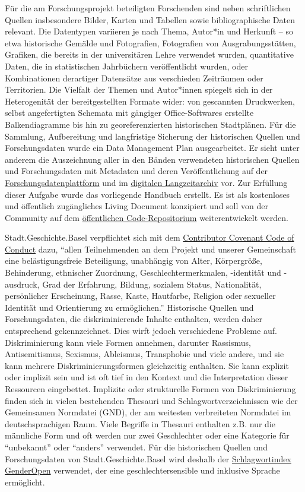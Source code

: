 \documentclass[
  letterpaper,
  DIV=11,
  numbers=noendperiod]{scrartcl}
\begin{document}
Für die am Forschungsprojekt beteiligten Forschenden sind neben
schriftlichen Quellen insbesondere Bilder, Karten und Tabellen sowie
bibliographische Daten relevant. Die Datentypen variieren je nach Thema,
Autor*in und Herkunft -- so etwa historische Gemälde und Fotografien,
Fotografien von Ausgrabungsstätten, Grafiken, die bereits in der
universitären Lehre verwendet wurden, quantitative Daten, die in
statistischen Jahrbüchern veröffentlicht wurden, oder Kombinationen
derartiger Datensätze aus verschieden Zeiträumen oder Territorien. Die
Vielfalt der Themen und Autor*innen spiegelt sich in der Heterogenität
der bereitgestellten Formate wider: von gescannten Druckwerken, selbst
angefertigten Schemata mit gängiger Office-Softwares erstellte
Balkendiagramme bis hin zu georeferenzierten historischen Stadtplänen.
Für die Sammlung, Aufbereitung und langfristige Sicherung der
historischen Quellen und Forschungsdaten wurde ein Data Management Plan
ausgearbeitet. Er sieht unter anderem die Auszeichnung aller in den
Bänden verwendeten historischen Quellen und Forschungsdaten mit
Metadaten und deren Veröffentlichung auf der
\href{https://forschung.stadtgeschichtebasel.ch/}{Forschungsdatenplattform}
und im
\href{https://zenodo.org/communities/stadt-geschichte-basel/}{digitalen
Langzeitarchiv} vor. Zur Erfüllung dieser Aufgabe wurde das vorliegende
Handbuch erstellt. Es ist als kostenloses und öffentlich zugängliches
Living Document konzipiert und soll von der Community auf dem
\href{https://github.com/maehr/diskriminierungsfreie-metadaten}{öffentlichen
Code-Repositorium} weiterentwickelt werden.

Stadt.Geschichte.Basel verpflichtet sich mit dem
\href{https://www.contributor-covenant.org/version/2/1/code_of_conduct/}{Contributor
Covenant Code of Conduct} dazu, ``allen Teilnehmenden an dem Projekt und
unserer Gemeinschaft eine belästigungsfreie Beteiligung, unabhängig von
Alter, Körpergröße, Behinderung, ethnischer Zuordnung,
Geschlechtermerkmalen, -identität und -ausdruck, Grad der Erfahrung,
Bildung, sozialem Status, Nationalität, persönlicher Erscheinung, Rasse,
Kaste, Hautfarbe, Religion oder sexueller Identität und Orientierung zu
ermöglichen.'' Historische Quellen und Forschungsdaten, die
diskriminierende Inhalte enthalten, werden daher entsprechend
gekennzeichnet. Dies wirft jedoch verschiedene Probleme auf.
Diskriminierung kann viele Formen annehmen, darunter Rassismus,
Antisemitismus, Sexismus, Ableismus, Transphobie und viele andere, und
sie kann mehrere Diskriminierungsformen gleichzeitig enthalten. Sie kann
explizit oder implizit sein und ist oft tief in den Kontext und die
Interpretation dieser Ressourcen eingebettet. Implizite oder
strukturelle Formen von Diskriminierung finden sich in vielen
bestehenden Thesauri und Schlagwortverzeichnissen wie der Gemeinsamen
Normdatei (GND), der am weitesten verbreiteten Normdatei im
deutschsprachigen Raum. Viele Begriffe in Thesauri enthalten z.B. nur
die männliche Form und oft werden nur zwei Geschlechter oder eine
Kategorie für ``unbekannt'' oder ``anders'' verwendet. Für die
historischen Quellen und Forschungsdaten von Stadt.Geschichte.Basel wird
deshalb der
\href{https://opengenderplatform.de/schlagwortindex}{Schlagwortindex
GenderOpen} verwendet, der eine geschlechtersensible und inklusive
Sprache ermöglicht.
\end{document}
